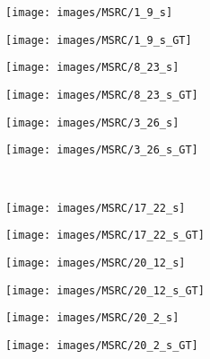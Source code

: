 \begin{figure}[t]
 \centering
 \begin{subfigure}[c]{0.16\textwidth}
  \centering
  \texttt{[image: images/MSRC/1\_9\_s]}
 \end{subfigure}
 \begin{subfigure}[c]{0.16\textwidth}
  \centering
  \texttt{[image: images/MSRC/1\_9\_s\_GT]}
 \end{subfigure}
 \begin{subfigure}[c]{0.16\textwidth}
  \centering
  \texttt{[image: images/MSRC/8\_23\_s]}
 \end{subfigure}
 \begin{subfigure}[c]{0.16\textwidth}
  \centering
  \texttt{[image: images/MSRC/8\_23\_s\_GT]}
 \end{subfigure}
 \begin{subfigure}[c]{0.16\textwidth}
  \centering
  \texttt{[image: images/MSRC/3\_26\_s]}
 \end{subfigure}
 \begin{subfigure}[c]{0.16\textwidth}
  \centering
  \texttt{[image: images/MSRC/3\_26\_s\_GT]}
 \end{subfigure}
 \\
 \begin{subfigure}[c]{0.16\textwidth}
  \centering
  \texttt{[image: images/MSRC/17\_22\_s]}
 \end{subfigure}
 \begin{subfigure}[c]{0.16\textwidth}
  \centering
  \texttt{[image: images/MSRC/17\_22\_s\_GT]}
 \end{subfigure}
 \begin{subfigure}[c]{0.16\textwidth}
  \centering
  \texttt{[image: images/MSRC/20\_12\_s]}
 \end{subfigure}
 \begin{subfigure}[c]{0.16\textwidth}
  \centering
  \texttt{[image: images/MSRC/20\_12\_s\_GT]}
 \end{subfigure}
 \begin{subfigure}[c]{0.16\textwidth}
  \centering
  \texttt{[image: images/MSRC/20\_2\_s]}
 \end{subfigure}
 \begin{subfigure}[c]{0.16\textwidth}
  \centering
  \texttt{[image: images/MSRC/20\_2\_s\_GT]}
 \end{subfigure}
 \\

\end{figure}
